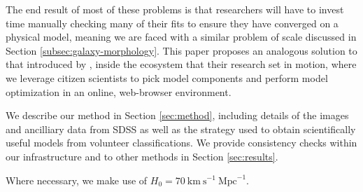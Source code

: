 \documentclass[../main.tex]{subfiles}
\begin{document}
The end result of most of these problems is that researchers will have to invest time manually checking many of their fits to ensure they have converged on a physical model, meaning we are faced with a similar problem of scale discussed in Section \ref{subsec:galaxy-morphology}. This paper proposes an analogous solution to that introduced by \cite{Lintott2008:0804.4483v1}, inside the ecosystem that their research set in motion, where we leverage citizen scientists to pick model components and perform model optimization in an online, web-browser environment.

We describe our method in Section \ref{sec:method}, including details of the images and ancilliary data from SDSS as well as the strategy used to obtain scientifically useful models from volunteer classifications. We provide consistency checks within our infrastructure and to other methods in Section \ref{sec:results}.

Where necessary, we make use of $H_0 = 70\ \text{km}\ \text{s}^{-1}\ \text{Mpc}^{-1}$.
\end{document}
